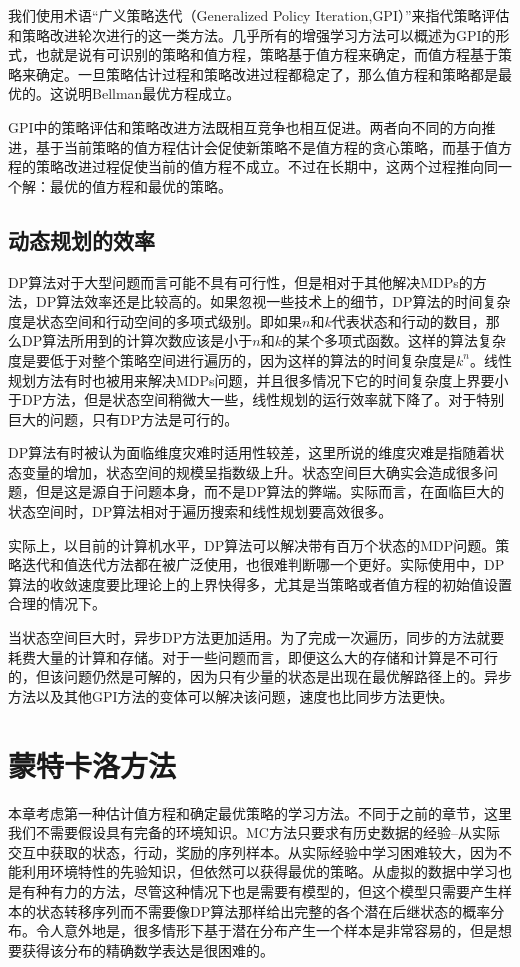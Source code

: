 \documentclass{ctexart}
\begin{document}
            我们使用术语“广义策略迭代（Generalized Policy Iteration,GPI）”来指代策略评估和策略改进轮次进行的这一类方法。几乎所有的增强学习方法可以概述为GPI的形式，也就是说有可识别的策略和值方程，策略基于值方程来确定，而值方程基于策略来确定。一旦策略估计过程和策略改进过程都稳定了，那么值方程和策略都是最优的。这说明Bellman最优方程成立。

            GPI中的策略评估和策略改进方法既相互竞争也相互促进。两者向不同的方向推进，基于当前策略的值方程估计会促使新策略不是值方程的贪心策略，而基于值方程的策略改进过程促使当前的值方程不成立。不过在长期中，这两个过程推向同一个解：最优的值方程和最优的策略。

        \subsection{动态规划的效率}
            DP算法对于大型问题而言可能不具有可行性，但是相对于其他解决MDPs的方法，DP算法效率还是比较高的。如果忽视一些技术上的细节，DP算法的时间复杂度是状态空间和行动空间的多项式级别。即如果$n$和$k$代表状态和行动的数目，那么DP算法所用到的计算次数应该是小于$n$和$k$的某个多项式函数。这样的算法复杂度是要低于对整个策略空间进行遍历的，因为这样的算法的时间复杂度是$k^n$。线性规划方法有时也被用来解决MDPs问题，并且很多情况下它的时间复杂度上界要小于DP方法，但是状态空间稍微大一些，线性规划的运行效率就下降了。对于特别巨大的问题，只有DP方法是可行的。

            DP算法有时被认为面临维度灾难时适用性较差，这里所说的维度灾难是指随着状态变量的增加，状态空间的规模呈指数级上升。状态空间巨大确实会造成很多问题，但是这是源自于问题本身，而不是DP算法的弊端。实际而言，在面临巨大的状态空间时，DP算法相对于遍历搜索和线性规划要高效很多。

            实际上，以目前的计算机水平，DP算法可以解决带有百万个状态的MDP问题。策略迭代和值迭代方法都在被广泛使用，也很难判断哪一个更好。实际使用中，DP算法的收敛速度要比理论上的上界快得多，尤其是当策略或者值方程的初始值设置合理的情况下。

            当状态空间巨大时，异步DP方法更加适用。为了完成一次遍历，同步的方法就要耗费大量的计算和存储。对于一些问题而言，即便这么大的存储和计算是不可行的，但该问题仍然是可解的，因为只有少量的状态是出现在最优解路径上的。异步方法以及其他GPI方法的变体可以解决该问题，速度也比同步方法更快。

    \section{蒙特卡洛方法}
        本章考虑第一种估计值方程和确定最优策略的学习方法。不同于之前的章节，这里我们不需要假设具有完备的环境知识。MC方法只要求有历史数据的经验--从实际交互中获取的状态，行动，奖励的序列样本。从实际经验中学习困难较大，因为不能利用环境特性的先验知识，但依然可以获得最优的策略。从虚拟的数据中学习也是有种有力的方法，尽管这种情况下也是需要有模型的，但这个模型只需要产生样本的状态转移序列而不需要像DP算法那样给出完整的各个潜在后继状态的概率分布。令人意外地是，很多情形下基于潜在分布产生一个样本是非常容易的，但是想要获得该分布的精确数学表达是很困难的。
        
\end{document}
